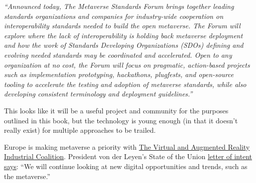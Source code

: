 \textit{``Announced today, The Metaverse Standards Forum brings together leading standards organizations and companies for industry-wide cooperation on interoperability standards needed to build the open metaverse. The Forum will explore where the lack of interoperability is holding back metaverse deployment and how the work of Standards Developing Organizations (SDOs) defining and evolving needed standards may be coordinated and accelerated. Open to any organization at no cost, the Forum will focus on pragmatic, action-based projects such as implementation prototyping, hackathons, plugfests, and open-source tooling to accelerate the testing and adoption of metaverse standards, while also developing consistent terminology and deployment guidelines.''}\par
This looks like it will be a useful project and community for the purposes outlined in this book, but the technology is young enough (in that it doesn't really exist) for multiple approaches to be trailed.\par
Europe is making metaverse a priority with \href{https://digital-strategy.ec.europa.eu/en/policies/virtual-and-augmented-reality-coalition}{The Virtual and Augmented Reality Industrial Coalition}. President von der Leyen’s State of the Union \href{https://state-of-the-union.ec.europa.eu/system/files/2022-09/SOTEU_2022_Letter_of_Intent_EN_0.pdf}{letter of intent says}:  ``We will continue looking at new digital opportunities and trends, such as the metaverse.'' 

